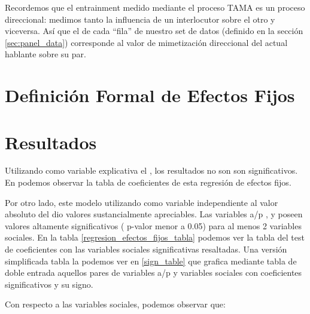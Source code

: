 Recordemos que el entrainment medido mediante el proceso TAMA es un proceso direccional: medimos tanto la influencia de un interlocutor sobre el otro y viceversa. Así que el \entrainment de cada ``fila'' de nuestro set de datos (definido en la sección \ref{sec:panel_data}) corresponde al valor de mimetización direccional del actual hablante sobre su par.


\section{Definición Formal de Efectos Fijos}


\section{Resultados}

Utilizando como variable explicativa el \entrainment, los resultados no son son significativos. En  podemos observar la tabla de coeficientes de esta regresión de efectos fijos.


Por otro lado, este modelo utilizando como variable independiente al valor absoluto del \entrainment dio valores sustancialmente apreciables. Las variables a/p \ENGMAX, \FOMEAN y \NOISETOHARMONICS poseen valores altamente significativos ( p-valor menor a 0.05) para al menos 2 variables sociales. En la tabla \ref{regresion_efectos_fijos_tabla} podemos ver la tabla del test de coeficientes con las variables sociales significativas resaltadas. Una versión simplificada tabla la podemos ver en \ref{sign_table} que grafica mediante tabla de doble entrada aquellos pares de variables a/p y variables sociales con coeficientes significativos y su signo.

Con respecto a las variables sociales, podemos observar que:

